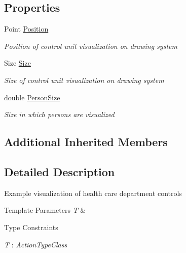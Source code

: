 \subsection*{Properties}
\begin{DoxyCompactItemize}
\item 
Point \hyperlink{class_sample_hospital_model_1_1_visualization_1_1_w_p_f_visualization_engine_health_care_department_control_unit_a7af7fadd903ca4aa578ceb80cf4747dd}{Position}
\begin{DoxyCompactList}\small\item\em Position of control unit visualization on drawing system \end{DoxyCompactList}\item 
Size \hyperlink{class_sample_hospital_model_1_1_visualization_1_1_w_p_f_visualization_engine_health_care_department_control_unit_abe4ba0d78d527ff6c4cdde7dd27943fc}{Size}
\begin{DoxyCompactList}\small\item\em Size of control unit visualization on drawing system \end{DoxyCompactList}\item 
double \hyperlink{class_sample_hospital_model_1_1_visualization_1_1_w_p_f_visualization_engine_health_care_department_control_unit_a53651357a0075b021a5ebad63112fc1a}{Person\+Size}
\begin{DoxyCompactList}\small\item\em Size in which persons are visualized \end{DoxyCompactList}\end{DoxyCompactItemize}
\subsection*{Additional Inherited Members}


\subsection{Detailed Description}
Example visualization of health care department controls 


\begin{DoxyTemplParams}{Template Parameters}
{\em T} & \\
\hline
\end{DoxyTemplParams}
\begin{Desc}
\item[Type Constraints]\begin{description}
\item[{\em T} : {\em Action\+Type\+Class}]\end{description}
\end{Desc}


